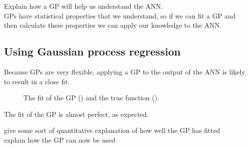\begin{todo}
	Explain how a GP will help us understand the ANN. \\
	GPs have statistical properties that we understand, so if we can fit a GP and then calculate these properties we can apply our knowledge to the ANN.
\end{todo}

\subsection{Using Gaussian process regression}

Because \acp{GP} are very flexible, applying a \ac{GP} to the output of the \acl{ANN} is likely to result in a close fit.

\begin{figure}[htbp]
	\centering
	
	\caption{The fit of the \ac{GP} (\gpcolour) and the true function (\truthcolour).}
	\label{fig:gp-fit}
\end{figure}

The fit of the \ac{GP} is almost perfect, as expected.

\begin{todo}
	give some sort of quantitative explanation of how well the GP has fitted \\
	explain how the GP can now be used
\end{todo}

